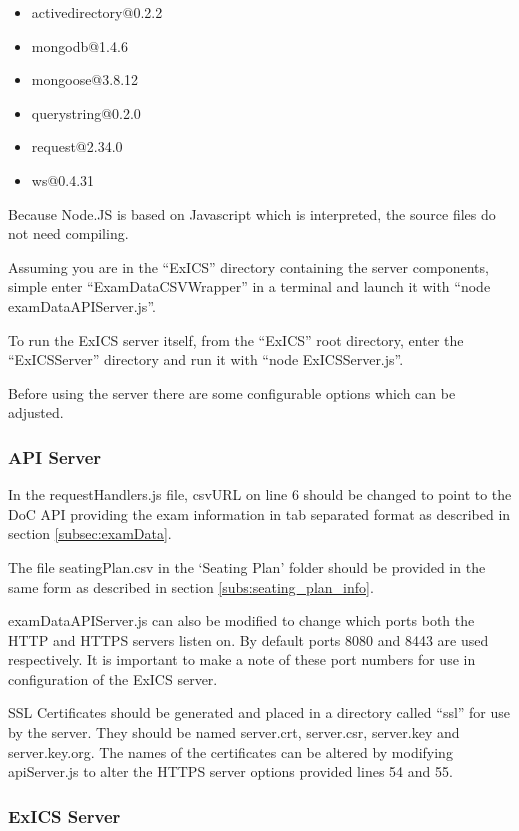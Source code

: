 \begin{itemize}

\item activedirectory@0.2.2
\item mongodb@1.4.6
\item mongoose@3.8.12
\item querystring@0.2.0
\item request@2.34.0
\item ws@0.4.31

\end{itemize}

Because Node.JS is based on Javascript which is interpreted, the source files do not need compiling.

Assuming you are in the ``ExICS'' directory containing the server components, simple enter ``ExamDataCSVWrapper'' in a terminal and launch it with ``node examDataAPIServer.js''.

To run the ExICS server itself, from the ``ExICS'' root directory, enter the ``ExICSServer'' directory and run it with ``node ExICSServer.js''.

Before using the server there are some configurable options which can be adjusted.

\subsubsection{API Server}

In the requestHandlers.js file, csvURL on line 6 should be changed to point to the DoC API providing the exam information in tab separated format as described in section \ref{subsec:examData}.

The file seatingPlan.csv in the `Seating Plan' folder should be provided in the same form as described in section \ref{subs:seating_plan_info}.

examDataAPIServer.js can also be modified to change which ports both the HTTP and HTTPS servers listen on.  By default ports 8080 and 8443 are used respectively.  It is important to make a note of these port numbers for use in configuration of the ExICS server.

SSL Certificates should be generated and placed in a directory called ``ssl'' for use by the server. They should be named server.crt, server.csr, server.key and server.key.org.  The names of the certificates can be altered by modifying apiServer.js to alter the HTTPS server options provided lines 54 and 55.

\subsubsection{ExICS Server}

